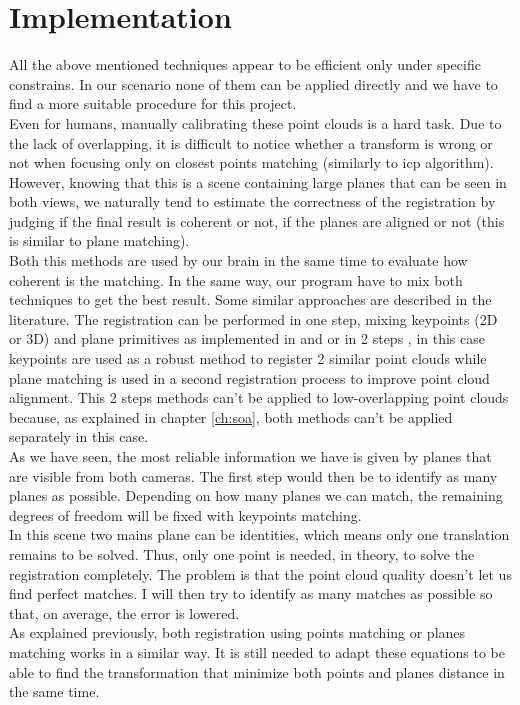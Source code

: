 
\chapter{Implementation} \label{chapt:implementation}

All the above mentioned techniques appear to be efficient only under specific constrains. In our scenario none of them can be applied directly and we have to find a more suitable procedure for this project. \\
Even for humans, manually calibrating these point clouds is a hard task. Due to the lack of overlapping, it is difficult to notice whether a transform is wrong or not when focusing only on closest points matching (similarly to \acrshort{icp} algorithm). However, knowing that this is a scene containing large planes that can be seen in both views, we naturally tend to estimate the correctness of the registration by judging if the final result is coherent or not, if the planes are aligned or not (this is similar to plane matching). \\
Both this methods are used by our brain in the same time to evaluate how coherent is the matching. In the same way, our program have to mix both techniques to get the best result. Some similar approaches are described in the literature. The registration can be performed in one step, mixing keypoints (2D or 3D) and plane primitives as implemented in \cite{mdou2013} and \cite{ytaguchi2013} or in 2 steps \cite{pkim16}, in this case keypoints are used as a robust method to register 2 similar point clouds while plane matching is used in a second registration process to improve point cloud alignment. This 2 steps methods can't be applied to low-overlapping point clouds because, as explained in chapter \ref{ch:soa}, both methods can't be applied separately in this case.\\
\newline
As we have seen, the most reliable information we have is given by planes that are visible from both cameras. The first step would then be to identify as many planes as possible. Depending on how many planes we can match, the remaining degrees of freedom will be fixed with keypoints matching. \\
In this scene two mains plane can be identities, which means only one translation remains to be solved. Thus, only one point is needed, in theory, to solve the registration completely. The problem is that the point cloud quality doesn't let us find perfect matches. I will then try to identify as many matches as possible so that, on average, the error is lowered. \\
\newline
As explained previously, both registration using points matching or planes matching works in a similar way. It is still needed to adapt these equations to be able to find the transformation that minimize both points and planes distance in the same time. 

